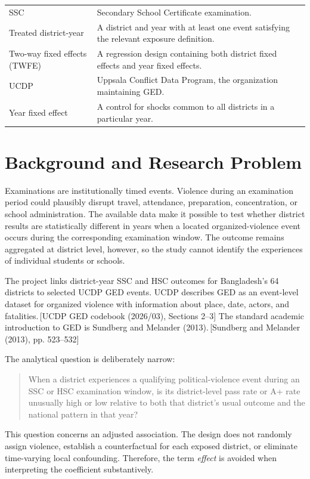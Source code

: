 \documentclass[11pt]{article}
\newcommand{\sourceref}[1]{\textcolor{black!65}{\,[#1]}}
\begin{document}
\begin{longtable}{p{}p{}}
SSC & Secondary School Certificate examination. \\
Treated district-year & A district and year with at least one event satisfying the relevant exposure definition. \\
Two-way fixed effects (TWFE) & A regression design containing both district fixed effects and year fixed effects. \\
UCDP & Uppsala Conflict Data Program, the organization maintaining GED. \\
Year fixed effect & A control for shocks common to all districts in a particular year. \\
\bottomrule
\end{longtable}

\section{Background and Research Problem}

Examinations are institutionally timed events. Violence during an examination period could plausibly disrupt travel, attendance, preparation, concentration, or school administration. The available data make it possible to test whether district results are statistically different in years when a located organized-violence event occurs during the corresponding examination window. The outcome remains aggregated at district level, however, so the study cannot identify the experiences of individual students or schools.

The project links district-year SSC and HSC outcomes for Bangladesh's 64 districts to selected UCDP GED events. UCDP describes GED as an event-level dataset for organized violence with information about place, date, actors, and fatalities.\sourceref{UCDP GED codebook (2026/03), Sections 2--3} The standard academic introduction to GED is Sundberg and Melander (2013).\sourceref{Sundberg and Melander (2013), pp. 523--532}

The analytical question is deliberately narrow:

\begin{quote}
When a district experiences a qualifying political-violence event during an SSC or HSC examination window, is its district-level pass rate or A+ rate unusually high or low relative to both that district's usual outcome and the national pattern in that year?
\end{quote}

This question concerns an adjusted association. The design does not randomly assign violence, establish a counterfactual for each exposed district, or eliminate time-varying local confounding. Therefore, the term \emph{effect} is avoided when interpreting the coefficient substantively.
\end{document}
